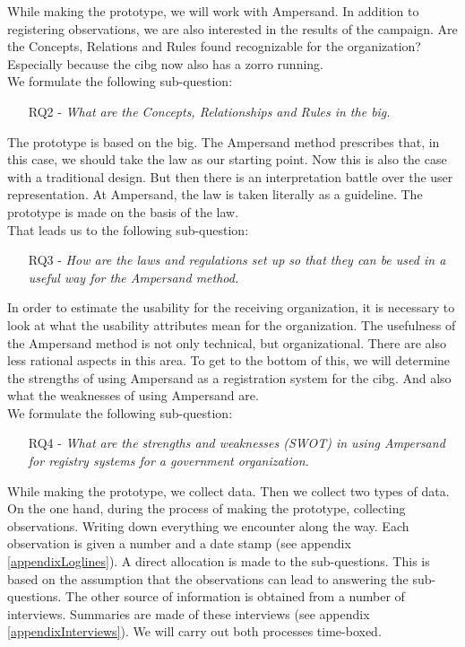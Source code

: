 While making the prototype, we will work with Ampersand.
In addition to registering observations, we are also interested in the results of the campaign.
Are the Concepts, Relations and Rules found recognizable for the organization?
Especially because the \acrshort{cibg} now also has a \acrshort{zorro} running.
\\We formulate the following sub-question:
\begin{enumerate}
    \item[RQ2]- \textit{What are the Concepts, Relationships and Rules in the \acrshort{big}.}
\end{enumerate}

The prototype is based on the \acrshort{big}.
The Ampersand method prescribes that, in this case, we should take the law as our starting point.
Now this is also the case with a traditional design.
But then there is an interpretation battle over the user representation.
At Ampersand, the law is taken literally as a guideline.
The prototype is made on the basis of the law.
\\That leads us to the following sub-question:
\begin{enumerate}
    \item[RQ3]- \textit{How are the laws and regulations set up so that they can be used in a useful way for the Ampersand method.}
\end{enumerate}

In order to estimate the usability for the receiving organization, it is necessary to look at what the usability attributes mean for the organization.
The usefulness of the Ampersand method is not only technical, but organizational.
There are also less rational aspects in this area.
To get to the bottom of this, we will determine the strengths of using Ampersand as a registration system for the \acrshort{cibg}.
And also what the weaknesses of using Ampersand are.
\\We formulate the following sub-question:
\begin{enumerate}
    \item[RQ4]- \textit{What are the strengths and weaknesses (SWOT) in using Ampersand for registry systems for a government organization.}
\end{enumerate}

While making the prototype, we collect data.
Then we collect two types of data.
On the one hand, during the process of making the prototype, collecting observations.
Writing down everything we encounter along the way.
Each observation is given a number and a date stamp (see appendix \ref{appendixLoglines}).
A direct allocation is made to the sub-questions.
This is based on the assumption that the observations can lead to answering the sub-questions.
The other source of information is obtained from a number of interviews.
Summaries are made of these interviews (see appendix \ref{appendixInterviews}).
We will carry out both processes time-boxed.


